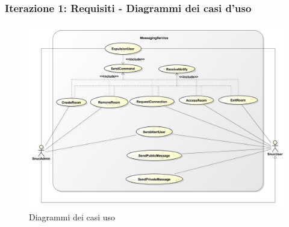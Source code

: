 \begin{frame}
  \frametitle{Iterazione 1: Requisiti - Diagrammi dei casi d'uso}
   \begin{figure}[h]
    \includegraphics[scale=0.145]{image_astah/UseCaseDiagram.png}{\centering}
    \caption{Diagrammi dei casi uso} 
    \label{fig_UCD}
   \end{figure}
\end{frame}

